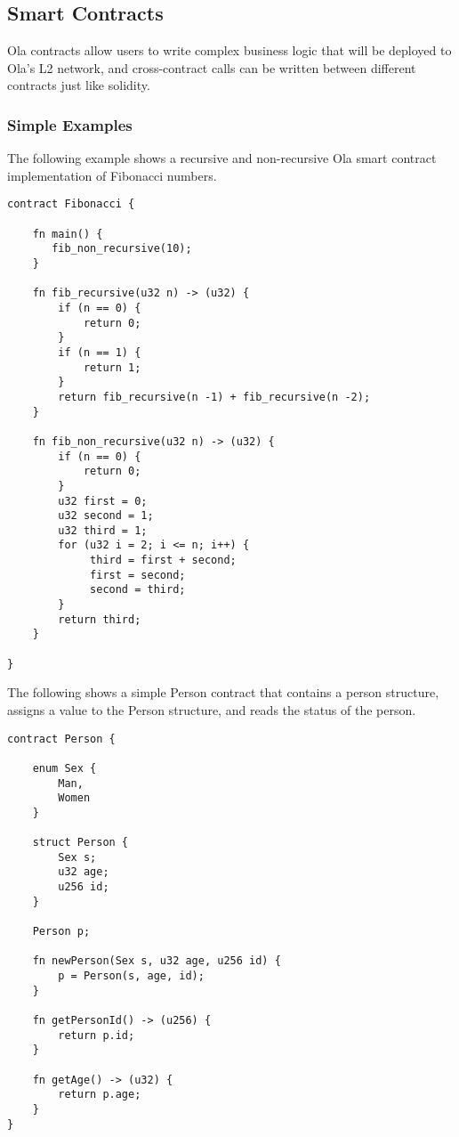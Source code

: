 \subsection{Smart Contracts}


Ola contracts allow users to write complex business logic that will be deployed to Ola's L2 network, and cross-contract calls can be written between different contracts just like solidity.

\subsubsection{Simple Examples}

The following example shows a recursive and non-recursive Ola smart contract implementation of Fibonacci numbers.

\begin{lstlisting}
contract Fibonacci {

    fn main() {
       fib_non_recursive(10);
    }

    fn fib_recursive(u32 n) -> (u32) {
        if (n == 0) {
            return 0;
        }
        if (n == 1) {
            return 1;
        }
        return fib_recursive(n -1) + fib_recursive(n -2);
    }

    fn fib_non_recursive(u32 n) -> (u32) {
        if (n == 0) {
            return 0;
        }
        u32 first = 0;
        u32 second = 1;
        u32 third = 1;
        for (u32 i = 2; i <= n; i++) {
             third = first + second;
             first = second;
             second = third;
        }
        return third;
    }

}
\end{lstlisting}

The following shows a simple Person contract that contains a person structure, assigns a value to the Person structure, and reads the status of the person.

\begin{lstlisting}
contract Person {

    enum Sex {
        Man,
        Women
    }

    struct Person {
        Sex s;
        u32 age;
        u256 id;
    }

    Person p;

    fn newPerson(Sex s, u32 age, u256 id) {
        p = Person(s, age, id);
    }

    fn getPersonId() -> (u256) {
        return p.id;
    }

    fn getAge() -> (u32) {
        return p.age;
    }
}
\end{lstlisting}

